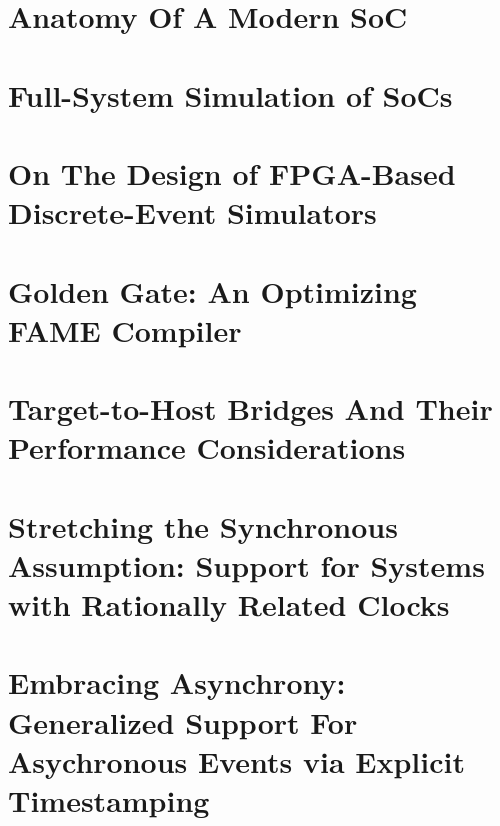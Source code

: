 \documentclass[phd]{ucbthesis}
\begin{document}
%

\chapter{Anatomy Of A Modern SoC}



\chapter{Full-System Simulation of SoCs}



\chapter{On The Design of FPGA-Based Discrete-Event Simulators}\label{ch:fpga-des}



\chapter{Golden Gate: An Optimizing FAME Compiler}\label{sec:golden-gate}



\chapter{Target-to-Host Bridges And Their Performance Considerations}\label{sec:bridges}



\chapter{Stretching the Synchronous Assumption: Support for Systems with Rationally Related Clocks}\label{sec:static-multiclock}



\chapter{Embracing Asynchrony: Generalized Support For Asychronous Events via Explicit Timestamping}\label{sec:dynamic-multiclock}

%

\printbibliography
\end{document}
